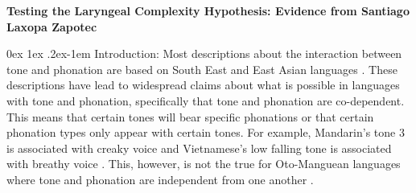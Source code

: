 \documentclass[11pt, letterpaper]{article}
\makeatletter
\renewcommand{\paragraph}{%
  \@startsection{paragraph}{4}%
  {\z@}{0ex \@plus 1ex \@minus .2ex}{-1em}%
  {\normalfont\normalsize\bfseries}%
}
\makeatother
\begin{document}
	

	
	
\begin{center}
	\textbf{Testing the Laryngeal Complexity Hypothesis: Evidence from Santiago Laxopa Zapotec}
\end{center}
\thispagestyle{empty}

\paragraph{Introduction:}
Most descriptions about the interaction between tone and phonation are based on South East and East Asian languages \citep[e.g.,][]{masicaDefiningLinguisticArea1976,thurgoodVietnameseTonogenesisRevising2002,michaudComplexTonesEast2012,brunelleTonePhonationSoutheast2016,kuangCovariationVoiceQuality2017}.
These descriptions have lead to widespread claims about what is possible in languages with tone and phonation, specifically that tone and phonation are co-dependent. 
This means that certain tones will bear specific phonations or that certain phonation types only appear with certain tones. 
For example, Mandarin's tone 3 is associated with creaky voice \citep{hockettPeipingPhonology1947} and Vietnamese's low falling tone is associated with breathy voice \citep{thurgoodVietnameseTonogenesisRevising2002}.
This, however, is not the true for Oto-Manguean languages where tone and phonation are independent from one another \citep{silvermanLaryngealComplexityOtomanguean1997}.
\end{document}
